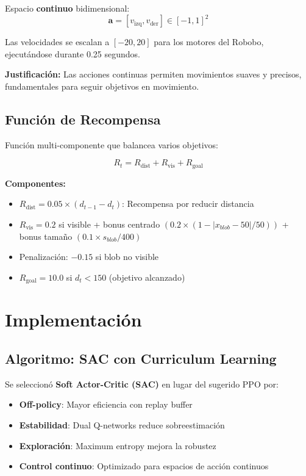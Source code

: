 \documentclass[12pt,a4paper]{article}
\begin{document}
Espacio \textbf{continuo} bidimensional:
\begin{equation}
\mathbf{a} = [v_{\text{izq}}, v_{\text{der}}] \in [-1, 1]^2
\end{equation}

Las velocidades se escalan a $[-20, 20]$ para los motores del Robobo, ejecutándose durante 0.25 segundos.

\textbf{Justificación:} Las acciones continuas permiten movimientos suaves y precisos, fundamentales para seguir objetivos en movimiento.

\subsection{Función de Recompensa}

Función multi-componente que balancea varios objetivos:

\begin{equation}
R_t = R_{\text{dist}} + R_{\text{vis}} + R_{\text{goal}}
\end{equation}

\textbf{Componentes:}
\begin{itemize}
    \item $R_{\text{dist}} = 0.05 \times (d_{t-1} - d_t)$: Recompensa por reducir distancia
    \item $R_{\text{vis}} = 0.2$ si visible + bonus centrado $(0.2 \times (1 - |x_{blob}-50|/50))$ + bonus tamaño $(0.1 \times s_{blob}/400)$
    \item Penalización: $-0.15$ si blob no visible
    \item $R_{\text{goal}} = 10.0$ si $d_t < 150$ (objetivo alcanzado)
\end{itemize}

\section{Implementación}

\subsection{Algoritmo: SAC con Curriculum Learning}

Se seleccionó \textbf{Soft Actor-Critic (SAC)} en lugar del sugerido PPO por:
\begin{itemize}
    \item \textbf{Off-policy}: Mayor eficiencia con replay buffer
    \item \textbf{Estabilidad}: Dual Q-networks reduce sobreestimación
    \item \textbf{Exploración}: Maximum entropy mejora la robustez
    \item \textbf{Control continuo}: Optimizado para espacios de acción continuos
\end{itemize}
\end{document}
